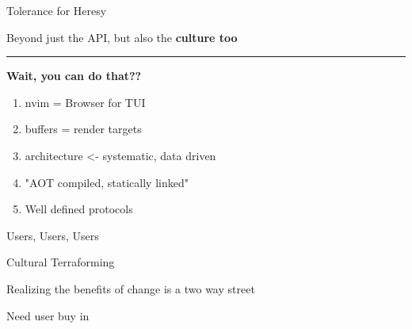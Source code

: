 \documentclass{beamer}
\begin{document}
\begin{frame}{Tolerance for Heresy}

	Beyond just the API, but also the \textbf{culture too}

	\rule{\textwidth}{0.1em}

	\textbf{Wait, you can do that??}

	\begin{enumerate}

		\item nvim = Browser for TUI

		\item buffers = render targets

		\item architecture <- systematic, data driven

		\item "AOT compiled, statically linked"

		\item Well defined protocols

	\end{enumerate}

\end{frame}


\begin{frame}{Users, Users, Users}

	\begin{block}{Cultural Terraforming}

		\vspace{0.5em}

		Realizing the benefits of change is a two way street

		Need user buy in

		\vspace{0.5em}

	\end{block}

\end{frame}
\end{document}
